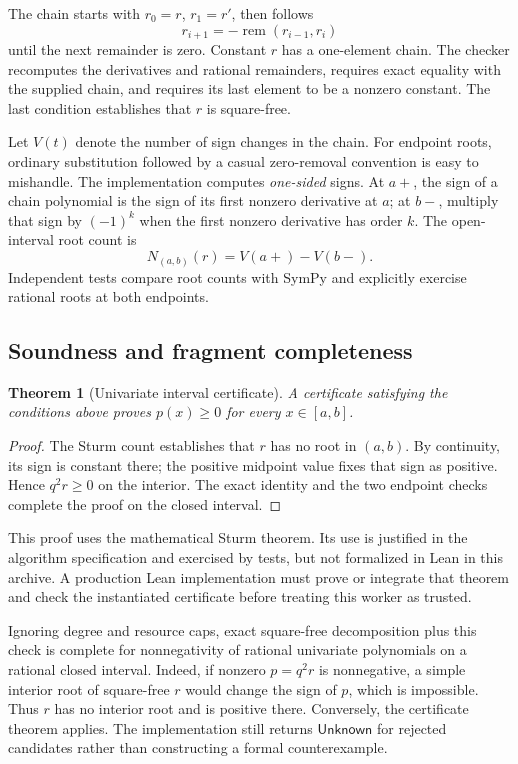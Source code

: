 \documentclass[11pt,a4paper]{article}
\newtheorem{theorem}[proposition]{Theorem}
\theoremstyle{definition}
\newcommand{\unknown}{\ensuremath{\mathsf{Unknown}}}
\begin{document}
The chain starts with $r_0=r$, $r_1=r'$, then follows
\[
 r_{i+1}=-\operatorname{rem}(r_{i-1},r_i)
\]
until the next remainder is zero. Constant $r$ has a one-element chain. The checker recomputes the derivatives and rational remainders, requires exact equality with the supplied chain, and requires its last element to be a nonzero constant. The last condition establishes that $r$ is square-free.

Let $V(t)$ denote the number of sign changes in the chain. For endpoint roots, ordinary substitution followed by a casual zero-removal convention is easy to mishandle. The implementation computes \emph{one-sided} signs. At $a+$, the sign of a chain polynomial is the sign of its first nonzero derivative at $a$; at $b-$, multiply that sign by $(-1)^k$ when the first nonzero derivative has order $k$. The open-interval root count is
\[
 N_{(a,b)}(r)=V(a+)-V(b-).
\]
Independent tests compare root counts with SymPy and explicitly exercise rational roots at both endpoints.

\subsection{Soundness and fragment completeness}

\begin{theorem}[Univariate interval certificate]
A certificate satisfying the conditions above proves $p(x)\ge0$ for every $x\in[a,b]$.
\end{theorem}
\begin{proof}
The Sturm count establishes that $r$ has no root in $(a,b)$. By continuity, its sign is constant there; the positive midpoint value fixes that sign as positive. Hence $q^2r\ge0$ on the interior. The exact identity and the two endpoint checks complete the proof on the closed interval.
\end{proof}

This proof uses the mathematical Sturm theorem. Its use is justified in the algorithm specification and exercised by tests, but not formalized in Lean in this archive. A production Lean implementation must prove or integrate that theorem and check the instantiated certificate before treating this worker as trusted.

Ignoring degree and resource caps, exact square-free decomposition plus this check is complete for nonnegativity of rational univariate polynomials on a rational closed interval. Indeed, if nonzero $p=q^2r$ is nonnegative, a simple interior root of square-free $r$ would change the sign of $p$, which is impossible. Thus $r$ has no interior root and is positive there. Conversely, the certificate theorem applies. The implementation still returns \unknown{} for rejected candidates rather than constructing a formal counterexample.
\end{document}
